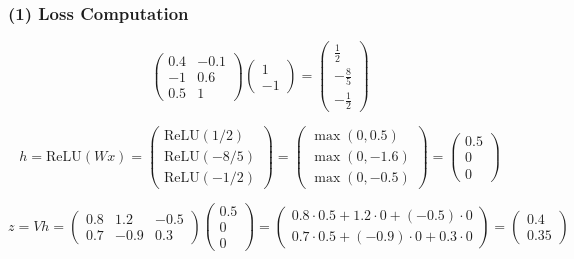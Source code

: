 \documentclass[12pt]{article}
\begin{document}
\subsubsection*{(1)  Loss Computation}


\[
\begin{pmatrix}
0.4 & -0.1 \\
-1 & 0.6 \\
0.5 & 1
\end{pmatrix}
\begin{pmatrix}
1 \\
-1
\end{pmatrix}
=
\begin{pmatrix}
\frac{1}{2} \\
-\frac{8}{5} \\
-\frac{1}{2}
\end{pmatrix}
\]

\[
h = \text{ReLU}(Wx) =
\begin{pmatrix}
\text{ReLU}(1/2) \\
\text{ReLU}(-8/5) \\
\text{ReLU}(-1/2)
\end{pmatrix}
=
\begin{pmatrix}
\max(0, 0.5) \\
\max(0, -1.6) \\
\max(0, -0.5)
\end{pmatrix}
=
\begin{pmatrix}
0.5 \\
0 \\
0
\end{pmatrix}
\]




\[
z = Vh = 
\begin{pmatrix}
0.8 & 1.2 & -0.5 \\
0.7 & -0.9 & 0.3
\end{pmatrix}
\begin{pmatrix}
0.5 \\
0 \\
0
\end{pmatrix}
=
\begin{pmatrix}
0.8 \cdot 0.5 + 1.2 \cdot 0 + (-0.5) \cdot 0 \\
0.7 \cdot 0.5 + (-0.9) \cdot 0 + 0.3 \cdot 0
\end{pmatrix}
=
\begin{pmatrix}
0.4 \\
0.35
\end{pmatrix}
\]
\end{document}
